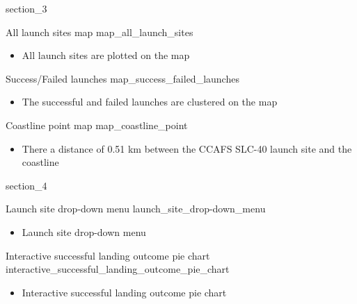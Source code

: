 {
{section_3}
\begin{frame}[plain]
\end{frame}
}

\begin{frame}{All launch sites map}
    {map_all_launch_sites}
    \begin{itemize}
        \item All launch sites are plotted on the map
    \end{itemize}
\end{frame}

\begin{frame}{Success/Failed launches}
    {map_success_failed_launches}
    \begin{itemize}
        \item The successful and failed launches are clustered on the map
    \end{itemize}
\end{frame}

\begin{frame}{Coastline point map}
    {map_coastline_point}
    \begin{itemize}
        \item There a distance of 0.51 km between the CCAFS SLC-40 launch site and the coastline
    \end{itemize}
\end{frame}

{
{section_4}
\begin{frame}[plain]
\end{frame}
}

\begin{frame}{Launch site drop-down menu}
    {launch_site_drop-down_menu}
    \begin{itemize}
        \item Launch site drop-down menu
    \end{itemize}
\end{frame}

\begin{frame}{Interactive successful landing outcome pie chart}
    {interactive_successful_landing_outcome_pie_chart}
    \begin{itemize}
        \item Interactive successful landing outcome pie chart
    \end{itemize}
\end{frame}

